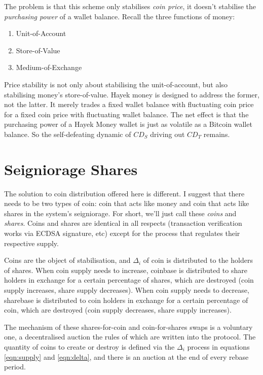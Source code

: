 \documentclass[twocolumn]{article}
\begin{document}
The problem is that this scheme only stabilises \emph{coin price}, it
doesn't stabilise the \emph{purchasing power} of a wallet
balance. Recall the three functions of money:
\begin{enumerate}
\item Unit-of-Account
\item Store-of-Value
\item Medium-of-Exchange
\end{enumerate}
Price stability is not only about stabilising the unit-of-account, but
also stabilising money's store-of-value. Hayek money is designed to
address the former, not the latter. It merely trades a fixed wallet
balance with fluctuating coin price for a fixed coin price with
fluctuating wallet balance. The net effect is that the purchasing
power of a Hayek Money wallet is just as volatile as a Bitcoin wallet
balance. So the self-defeating dynamic of $CD_{S}$ driving out
$CD_{T}$ remains.

\section*{Seigniorage Shares}
The solution to coin distribution offered here is different. I suggest
that there needs to be two types of coin: coin that acts like money
and coin that acts like shares in the system's seigniorage. For short,
we'll just call these \emph{coins} and \emph{shares}. Coins and shares
are identical in all respects (transaction verification works via
ECDSA signature, etc) except for the process that regulates their
respective supply.

Coins are the object of stabilisation, and $\Delta_{i}$ of coin is
distributed to the holders of shares. When coin supply needs to
increase, coinbase is distributed to share holders in exchange for a
certain percentage of shares, which are destroyed (coin supply
increases, share supply decreases). When coin supply needs to
decrease, sharebase is distributed to coin holders in exchange for a
certain percentage of coin, which are destroyed (coin supply
decreases, share supply increases). 

The mechanism of these shares-for-coin and coin-for-shares swaps is a
voluntary one, a decentralised auction the rules of which are written
into the protocol. The quantity of coins to create or destroy is
defined via the $\Delta_{i}$ process in equations \ref{eqn:supply} and
\ref{eqn:delta}, and there is an auction at the end of every rebase
period. 
\end{document}
